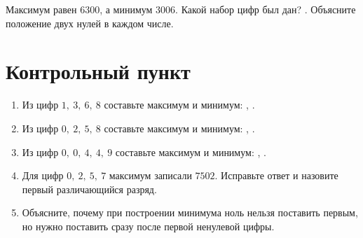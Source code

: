 \begin{fillbox}
  Максимум равен \(6300\), а минимум \textemdash{} \(3006\). Какой набор цифр был дан?
  \answerblank[48mm]. Объясните положение двух нулей в каждом числе.
\end{fillbox}


\section{Контрольный пункт}

\begin{checkpointbox}
  \begin{enumerate}[label=\textbf{\arabic*.}]
    \item Из цифр \(1,\ 3,\ 6,\ 8\) составьте максимум и минимум:
      \answerblank[32mm], \answerblank[32mm].
    \item Из цифр \(0,\ 2,\ 5,\ 8\) составьте максимум и минимум:
      \answerblank[32mm], \answerblank[32mm].
    \item Из цифр \(0,\ 0,\ 4,\ 4,\ 9\) составьте максимум и минимум:
      \answerblank[34mm], \answerblank[34mm].
    \item Для цифр \(0,\ 2,\ 5,\ 7\) максимум записали \(7502\). Исправьте
      ответ и назовите первый различающийся разряд.
    \item Объясните, почему при построении минимума ноль нельзя поставить
      первым, но нужно поставить сразу после первой ненулевой цифры.
  \end{enumerate}
\end{checkpointbox}

